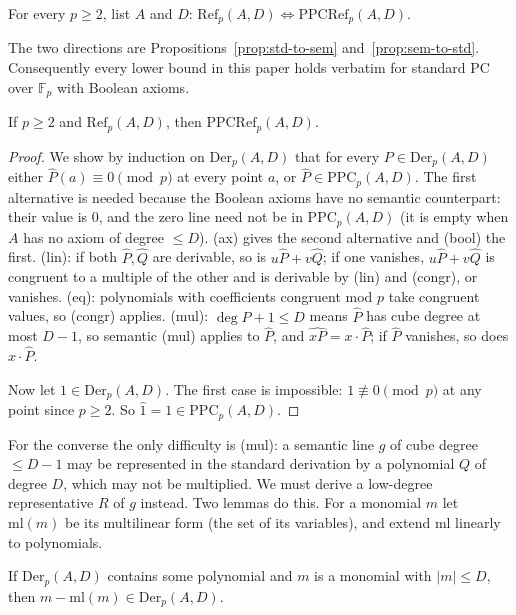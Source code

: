 \begin{theorem}\label{thm:refutes-iff}
For every $p\ge2$, list $A$ and $D$: $\mathrm{Ref}_p(A,D)\iff\mathrm{PPCRef}_p(A,D)$.
\end{theorem}

The two directions are Propositions~\ref{prop:std-to-sem} and~\ref{prop:sem-to-std}.
Consequently every lower bound in this paper holds verbatim for standard PC over
$\mathbb F_p$ with Boolean axioms.

\begin{proposition}\label{prop:std-to-sem}
If $p\ge2$ and $\mathrm{Ref}_p(A,D)$, then $\mathrm{PPCRef}_p(A,D)$.
\end{proposition}

\begin{proof}
We show by induction on $\mathrm{Der}_p(A,D)$ that for every $P\in\mathrm{Der}_p(A,D)$
either $\hat P(a)\equiv0\pmod p$ at every point $a$, or
$\hat P\in\mathrm{PPC}_p(A,D)$.  The first alternative is
needed because the Boolean axioms have no semantic counterpart: their value is $0$, and
the zero line need not be in $\mathrm{PPC}_p(A,D)$ (it is empty when $A$ has no axiom of
degree $\le D$).
(ax) gives the second alternative and (bool) the first.  (lin): if both $\hat P,\hat Q$
are derivable, so is $u\hat P+v\hat Q$; if one vanishes, $u\hat P+v\hat Q$ is congruent
to a multiple of the other and is derivable by (lin) and (congr), or vanishes.  (eq):
polynomials with coefficients congruent mod $p$ take congruent values, so (congr)
applies.  (mul): $\deg P+1\le D$ means $\hat P$ has cube degree at most $D-1$, so semantic
(mul) applies to $\hat P$, and $\widehat{xP}=x\cdot\hat P$; if $\hat P$ vanishes, so does
$x\cdot\hat P$.

Now let $1\in\mathrm{Der}_p(A,D)$.  The first case is impossible: $1\not\equiv0\pmod p$ at
any point since $p\ge2$.  So $\hat1=1\in\mathrm{PPC}_p(A,D)$.
\end{proof}

For the converse the only difficulty is (mul): a semantic line $g$ of cube degree $\le D-1$
may be represented in the standard derivation by a polynomial $Q$ of degree $D$, which may
not be multiplied.  We must derive a low-degree representative $R$ of $g$ instead.  Two
lemmas do this.  For a monomial $m$ let $\mathrm{ml}(m)$ be its multilinear form (the set of
its variables), and extend $\mathrm{ml}$ linearly to polynomials.

\begin{lemma}\label{lem:ml-reduce}
If $\mathrm{Der}_p(A,D)$ contains some polynomial and $m$ is a monomial with $|m|\le D$,
then $m-\mathrm{ml}(m)\in\mathrm{Der}_p(A,D)$.
\end{lemma}

